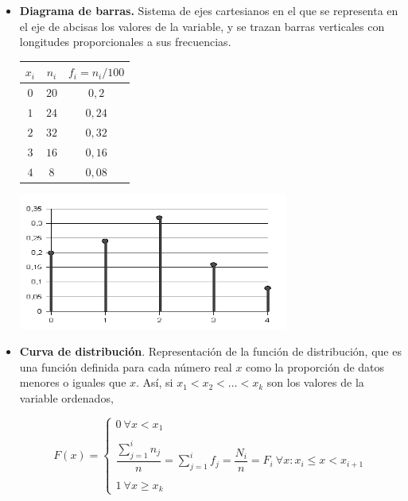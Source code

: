 \documentclass[]{article}
\begin{document}
	\begin{itemize}
		\item \textbf{Diagrama de barras. }Sistema de ejes cartesianos en el que se representa en el eje de abcisas los valores de la variable, y se trazan barras verticales con longitudes proporcionales a sus frecuencias.
		\begin{minipage}[t]{.45\linewidth}
			\raggedleft
			\vspace*{0pt}
			\begin{center}
				\begin{tabular}{| c | c | c |}
					\hline
					$x_i$ & $n_i$ & $f_i = n_i / 100$ \\ \hline
					$0$ & $20$ & $0,2$ \\
					$1$ & $24$ & $0,24$ \\
					$2$ & $32$ & $0,32$ \\
					$3$ & $16$ & $0,16$ \\
					$4$ & $8$ & $0,08$ \\
					\hline
				\end{tabular}
			\end{center}
		\end{minipage}%
		\begin{minipage}[t]{.45\linewidth}
			\vspace*{0pt}
			\raggedleft
			\begin{center}
				\includegraphics[scale = 0.5]{barra_discretas}
			\end{center}
		\end{minipage}
		\item \textbf{Curva de distribución}. Representación de la función de distribución, que es una función definida para cada número real $x$ como la proporción de datos menores o iguales que $x$. Así, si $x_1 < x_2 < \dots < x_k$ son los valores de la variable ordenados,
		
		\begin{minipage}[t]{.6\linewidth}
			\raggedleft
			\vspace*{0pt}
			\begin{equation*}
				F(x) = \left\{ \begin{array}{l}
					0 ~ \forall x < x_1\\
					\\ \dfrac{\sum_{j = 1}^i n_j}{n} = \sum_{j = 1}^i f_j = \dfrac{N_i}{n} = F_i ~ \forall x : x_i \leq x < x_{i+1} \\
					\\ 1 ~ \forall x \geq x_k
					\end{array}
				\right.
			\end{equation*}
			

\end{minipage}
\end{itemize}
\end{document}

